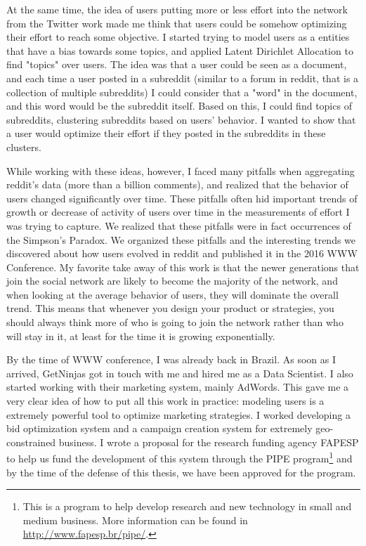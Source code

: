 At the same time, the idea of users putting more or less effort into the network from the Twitter work made me think that users could be somehow optimizing their effort to reach some objective. I started trying to model users as a entities that have a bias towards some topics, and applied Latent Dirichlet Allocation to find "topics" over users. The idea was that a user could be seen as a document, and each time a user posted in a subreddit (similar to a forum in reddit, that is a collection of multiple subreddits) I could consider that a "word" in the document, and this word would be the subreddit itself. Based on this, I could find topics of subreddits, clustering subreddits based on users' behavior. I wanted to show that a user would optimize their effort if they posted in the subreddits in these clusters.

While working with these ideas, however, I faced many pitfalls when aggregating reddit's data (more than a billion comments), and realized that the behavior of users changed significantly over time. These pitfalls often hid important trends of growth or decrease of activity of users over time in the measurements of effort I was trying to capture. We realized that these pitfalls were in fact occurrences of the Simpson's Paradox. We organized these pitfalls and the interesting trends we discovered about how users evolved in reddit and published it in the 2016 WWW Conference. My favorite take away of this work is that the newer generations that join the social network are likely to become the majority of the network, and when looking at the average behavior of users, they will dominate the overall trend. This means that whenever you design your product or strategies, you should always think more of who is going to join the network rather than who will stay in it, at least for the time it is growing exponentially.

By the time of WWW conference, I was already back in Brazil. As soon as I arrived, GetNinjas got in touch with me and hired me as a Data Scientist. I also started working with their marketing system, mainly AdWords. This gave me a very clear idea of how to put all this work in practice: modeling users is a extremely powerful tool to optimize marketing strategies. I worked developing a bid optimization system and a campaign creation system for extremely geo-constrained business. I wrote a proposal for the research funding agency FAPESP to help us fund the development of this system through the PIPE program\footnote{This is a program to help develop research and new technology in small and medium business. More information can be found in \url{http://www.fapesp.br/pipe/}.} and by the time of the defense of this thesis, we have been approved for the program.

